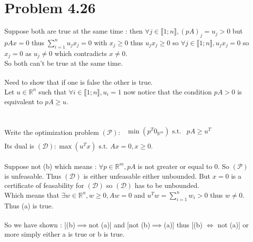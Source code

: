\documentclass{article}
\begin{document}
\section*{Problem 4.26}
Suppose both are true at the same time : then $\forall j\in\llbracket 1;n\rrbracket, (pA)_j = u_j > 0$ but $pAx = 0$ thus $\sum\limits_{i=1}^n u_jx_j = 0 $ with $x_j\ge 0$ thus $u_jx_j \ge 0$ so $\forall j \in \llbracket 1;n\rrbracket, u_jx_j = 0 $ so $x_j = 0$ as $u_j\neq 0$ which contradicts $x \neq 0$.
\\
So both can't be true at the same time.
\\\\
Need to show that if one is false the other is true.
\\
Let  $u\in \mathbb{R}^n$ such that $\forall i \in \llbracket 1;n \rrbracket , u_i = 1 $ now notice that the condition $pA>0$ is equivalent to $pA\ge u$.
\\\\\\
Write the optimization problem $(\mathcal{P}):$
$\begin{array}{cc}
    \min(p^T0_{\mathbb{R}^m})\text{ s.t.}& pA \ge u^T\\
\end{array}$
\\
Its dual is $(\mathcal{D}): \max(u^Tx)\text{ s.t. } Ax=0, x\ge 0$.
\\\\
Suppose not (b) which means : $\forall p\in\mathbb{R}^m, pA$ is not greater or equal to 0. So $(\mathcal{P})$ is unfeasable.
Thus $(\mathcal{D})$ is either unfeasable either unbounded. But $x=0$ is a certificate of feasability for $(\mathcal{D})$ so $(\mathcal{D})$ has to be unbounded.
\\
Which means that $\exists w \in \mathbb{R}^n, w\ge0, Aw = 0$ and $u^Tw = \sum\limits_{i=1}^n w_i >0$ thus $w \neq 0$. Thus (a) is true.
\\\\
So we have shown : [(b)$ \implies $not (a)] and [not (b)$ \implies $(a)] thus [(b) $ \Leftrightarrow$ not (a)] or more simply either a is true or b is true.
\end{document}
